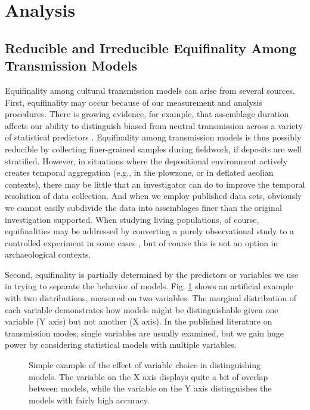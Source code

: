 \documentclass[10pt,letterpaper]{article}
\begin{document}
\section{Analysis}\label{analysis}

\subsection{Reducible and Irreducible Equifinality Among Transmission
Models}\label{measuring-equifinality-among-transmission-models}

Equifinality among cultural transmission models can arise from several sources. First, equifinality may occur because of our measurement and analysis
procedures. There is growing evidence, for example, that assemblage
duration affects our ability to distinguish biased from neutral
transmission across a variety of statistical predictors
\cite{Madsen2012TA, Porcic2014Exploring-the-E, Premo:2014jv}. Equifinality among transmission models is thus possibly reducible by collecting finer-grained samples during fieldwork, if deposits are well stratified.  However, in situations where the depositional environment actively creates temporal aggregation (e.g., in the plowzone, or in deflated aeolian contexts), there may be little that an investigator can do to improve the temporal resolution of data collection.  And when we employ published data sets, obviously we cannot easily subdivide the data into assemblages finer than the original investigation supported.  When studying living populations, of course, equifinalities may be addressed by converting a purely observational study to a controlled experiment in some cases \cite{kempe2014experimental, mesoudi2014experimental, schillinger2014copying},
but of course this is not an option in archaeological contexts.

Second, equifinality is partially determined by the predictors or variables we use in trying to separate the behavior of models.  Fig. \ref{fig1} shows an artificial example with two distributions, measured on two variables.  The marginal distribution of each variable demonstrates how models might be distinguishable given one variable (Y axis) but not another (X axis).  In the published literature on transmission modes, single variables are usually examined, but we gain huge power by considering statistical models with multiple variables.  


\begin{figure}
	\caption{Simple example of the effect of variable choice in distinguishing models.  The variable on the X axis displays quite a bit of overlap between models, while the variable on the Y axis distinguishes the models with fairly high accuracy.}
	\label{fig1}
\end{figure}
\end{document}

